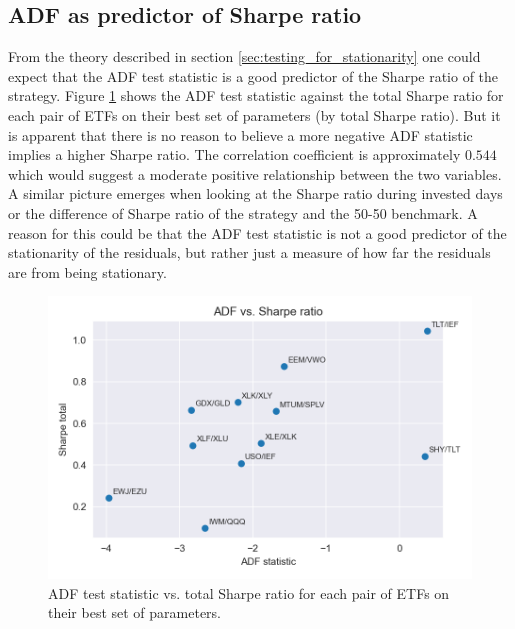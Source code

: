 \documentclass{article}
\begin{document}
\subsection{ADF as predictor of Sharpe ratio}
From the theory described in section \ref{sec:testing_for_stationarity} one could expect that the ADF test statistic is a good predictor of the Sharpe ratio of the strategy. Figure \ref{fig:adf_vs_sharpe} shows the ADF test statistic against the total Sharpe ratio for each pair of ETFs on their best set of parameters (by total Sharpe ratio).
But it is apparent that there is no reason to believe a more negative ADF statistic implies a higher Sharpe ratio. The correlation coefficient is approximately $0.544$ which would suggest a moderate positive relationship between the two variables. A similar picture emerges when looking at the Sharpe ratio during invested days or the difference of Sharpe ratio of the strategy and the 50-50 benchmark.
A reason for this could be that the ADF test statistic is not a good predictor of the stationarity of the residuals, but rather just a measure of how far the residuals are from being stationary.
\begin{figure}[htbp]
\centering
\includegraphics[width=0.8\linewidth]{adf_vs_sharpe_total.png}
\caption{ADF test statistic vs. total Sharpe ratio for each pair of ETFs on their best set of parameters.}
\label{fig:adf_vs_sharpe}
\end{figure}
\end{document}
